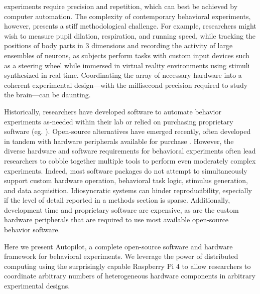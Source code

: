 \documentclass[nohyper, justified, notitlepage, marginals=raggedright,twoside=false,debug]{tufte-autopilot}
\begin{document}
 experiments require precision and repetition, which can best be achieved by computer automation. The complexity of contemporary behavioral experiments, however, presents a stiff methodological challenge. For example, researchers might wish to measure pupil dilation\citep{reimerPupilFluctuationsTrack2016, reimerPupilFluctuationsTrack2016}, respiration\citep{parabuckiOdorConcentrationChange2019}, and running speed\citep{niellModulationVisualResponses2010}, while tracking the positions of body parts in 3 dimensions\citep{nathUsingDeepLabCut3D2019} and recording the activity of large ensembles of neurons\citep{junFullyIntegratedSilicon2017}, as subjects perform tasks with custom input devices such as a steering wheel\citep{burgessHighYieldMethodsAccurate2017} while immersed in virtual reality environments using stimuli synthesized in real time\citep{thurleyVirtualRealitySystems2017,chambersOnlineStimulusOptimization2014}. Coordinating the array of necessary hardware into a coherent experimental design---with the millisecond precision required to study the brain---can be daunting.

Historically, researchers have developed software to automate behavior experiments as-needed within their lab or relied on purchasing proprietary software (eg. \citep{elliottNationalInstrumentsLabVIEW2007}). Open-source alternatives have emerged recently, often developed in tandem with hardware peripherals available for purchase \citep{ephysPyControl2019,sandersSanworksBPod}. However, the diverse hardware and software requirements for behavioral experiments often lead researchers to cobble together multiple tools to perform even moderately complex experiments. Indeed, most software packages do not attempt to simultaneously support custom hardware operation, behavioral task logic, stimulus generation, and data acquisition. Idiosyncratic systems can hinder reproducibility, especially if the level of detail reported in a methods section is sparse\citep{wallReliabilityStartsExperimental2019}. Additionally, development time and proprietary software are expensive, as are the custom hardware peripherals that are required to use most available open-source behavior software.
\vspace{12pt}

Here we present Autopilot, a complete open-source software and hardware framework for behavioral experiments. We leverage the power of distributed computing using the surprisingly capable Raspberry Pi 4 to allow researchers to coordinate arbitrary numbers of heterogeneous hardware components in arbitrary experimental designs.
\end{document}
